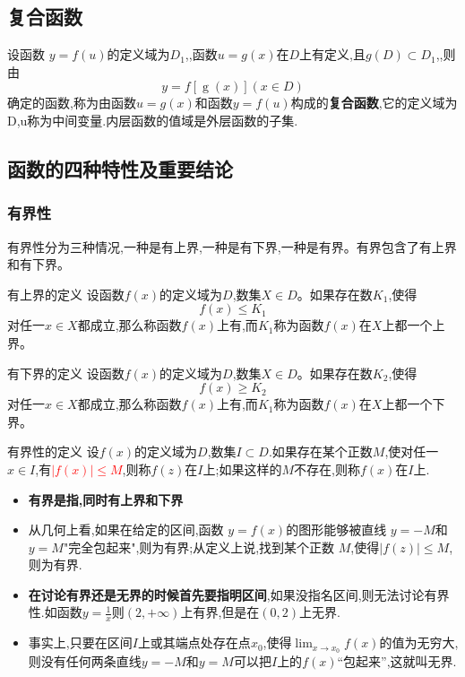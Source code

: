 \documentclass[12pt, a4paper, oneside, UTF8]{ctexbook}  %
\begin{document}
\subsection{复合函数}
设函数 $y=f(u)$的定义域为$D_1$,,函数$u=g(x)$在$D$上有定义,且$g(D) \subset D_1$,,则由
$$
    y=f[\operatorname{g}(x)](x{\in}D)
$$
确定的函数,称为由函数$u=g(x)$和函数$y=f(u)$构成的\textbf{复合函数},它的定义域为D,u称为中间变量.内层函数的值域是外层函数的子集.
\subsection{函数的四种特性及重要结论}
\subsubsection{有界性}
有界性分为三种情况,一种是有上界,一种是有下界,一种是有界。有界包含了有上界和有下界。
\begin{defn}{有上界的定义}{}
    设函数$f(x)$的定义域为$D$,数集$X \in D$。如果存在数$K_1$,使得
    $$
        f(x) \le K_1
    $$
    对任一$x \in X$都成立,那么称函数$f(x)$上有,而$K_1$称为函数$f(x)$在$X$上都一个上界。
\end{defn}
\begin{defn}{有下界的定义}{}
    设函数$f(x)$的定义域为$D$,数集$X \in D$。如果存在数$K_2$,使得
    $$
        f(x) \geq  K_2
    $$
    对任一$x \in X$都成立,那么称函数$f(x)$上有,而$K_1$称为函数$f(x)$在$X$上都一个下界。
\end{defn}
\begin{defn}{有界性的定义}{}
    设$f(x)$的定义域为$D$,数集$I \subset D$.如果存在某个正数$M$,使对任一$x \in I$,有\textcolor{red}{$|f(x)| \leqslant M$},则称$f(z)$在$I$上;如果这样的$M$不存在,则称$f(x)$在$I$上.
\end{defn}
\begin{itemize}
    \item \textbf{有界是指,同时有上界和下界}
    \item 从几何上看,如果在给定的区间,函数 $y=f(x)$的图形能够被直线 $y=-M$和 $y=M$"完全包起来",则为有界;从定义上说,找到某个正数 $M$,使得$|f(z)| \leqslant M$,则为有界.
    \item \textbf{在讨论有界还是无界的时候首先要指明区间},如果没指名区间,则无法讨论有界性.如函数$y=\frac{1}{x}$则$(2,+\infty)$上有界,但是在$(0,2)$上无界.
    \item 事实上,只要在区间$I$上或其端点处存在点$x_0$,使得$\lim_{x\to x_0} f(x)$的值为无穷大,则没有任何两条直线$y=-M$和$y=M$可以把$I$上的$f(x)$“包起来”,这就叫无界.
\end{itemize}
\end{document}
